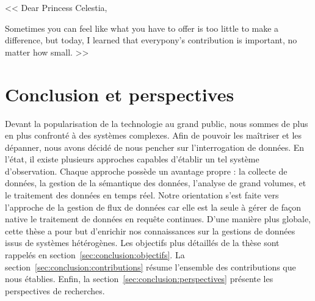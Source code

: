 \begin{savequote}[.5\textwidth]
<< Dear Princess Celestia,

\quad Sometimes you can feel like what you have to offer is too little to make a difference, but today, I learned that everypony's contribution is important, no matter how small. >>
\end{savequote}

\chapter{Conclusion et perspectives}\label{chap:conclusion}
\chaptertoc


Devant la popularisation de la technologie au grand public, nous sommes de plus en plus confronté à des systèmes complexes. Afin de pouvoir les maîtriser et les dépanner, nous avons décidé de nous pencher sur l'interrogation de données. En l'état, il existe plusieurs approches capables d'établir un tel système d'observation. Chaque approche possède un avantage propre : la collecte de données, la gestion de la sémantique des données, l'analyse de grand volumes, et le traitement des données en temps réel. Notre orientation s'est faite vers l'approche de la gestion de flux de données car elle est la seule à gérer de façon native le traitement de données en requête continues. D'une manière plus globale, cette thèse a pour but d'enrichir nos connaissances sur la gestions de données issus de systèmes hétérogènes. Les objectifs plus détaillés de la thèse sont rappelés en section~\ref{sec:conclusion:objectifs}. La section~\ref{sec:conclusion:contributions} résume l'ensemble des contributions que nous établies. Enfin, la section~\ref{sec:conclusion:perspectives} présente les perspectives de recherches.




